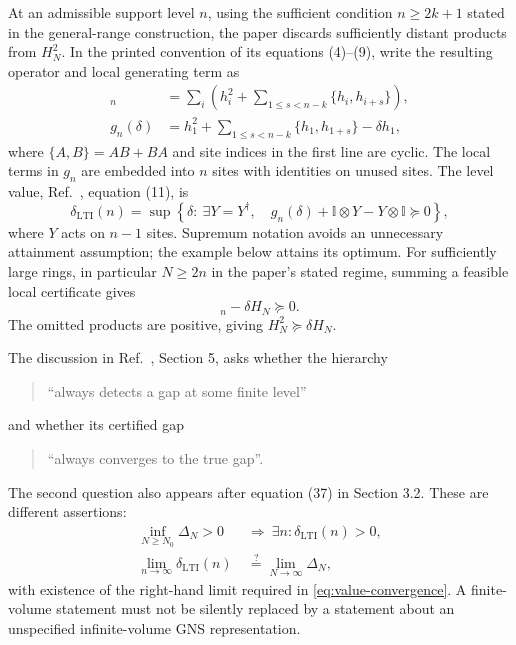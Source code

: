 \documentclass{article}
\newcommand{\id}{\mathbb I}
\begin{document}
At an admissible support level $n$, using the sufficient condition
$n\geq2k+1$ stated in the general-range construction, the paper discards
sufficiently distant products from $H_N^2$. In the printed convention of its equations (4)--(9),
write the resulting operator and local generating term as
\begin{align}
  [H_N^2]_n
    &=\sum_i\left(h_i^2+
      \sum_{1\leq s<n-k}\{h_i,h_{i+s}\}\right),
      \label{eq:truncated}\\
  g_n(\delta)
    &=h_1^2+\sum_{1\leq s<n-k}\{h_1,h_{1+s}\}-\delta h_1,
      \label{eq:generator}
\end{align}
where $\{A,B\}=AB+BA$ and site indices in the first line are cyclic.
The local terms in $g_n$ are embedded into $n$ sites with identities on
unused sites. The level value, Ref.~\cite{LTI}, equation (11), is
\begin{equation}
  \delta_{\mathrm{LTI}}(n)
  =\sup\left\{\delta:\ \exists Y=Y^\dagger,\quad
    g_n(\delta)+\id\otimes Y-Y\otimes\id\succeq0\right\},
  \label{eq:lti}
\end{equation}
where $Y$ acts on $n-1$ sites. Supremum notation avoids an unnecessary
attainment assumption; the example below attains its optimum.
For sufficiently large rings, in particular $N\geq2n$ in the paper's
stated regime, summing a feasible local certificate gives
\begin{equation}
  [H_N^2]_n-\delta H_N\succeq0.
  \label{eq:global-certificate}
\end{equation}
The omitted products are positive, giving $H_N^2\succeq\delta H_N$.

The discussion in Ref.~\cite{LTI}, Section 5, asks whether the hierarchy
\begin{quote}
``always detects a gap at some finite level''
\end{quote}
and whether its certified gap
\begin{quote}
``always converges to the true gap''.
\end{quote}
The second question also appears after equation (37) in Section 3.2.
These are different assertions:
\begin{align}
  \inf_{N\geq N_0}\Delta_N>0
    &\ \Longrightarrow\ \exists n:\delta_{\mathrm{LTI}}(n)>0,
    \label{eq:detection}\\
  \lim_{n\to\infty}\delta_{\mathrm{LTI}}(n)
    &\ \stackrel{?}{=}\lim_{N\to\infty}\Delta_N,
    \label{eq:value-convergence}
\end{align}
with existence of the right-hand limit required in
\eqref{eq:value-convergence}. A finite-volume statement must not be silently
replaced by a statement about an unspecified infinite-volume GNS
representation.
\end{document}
